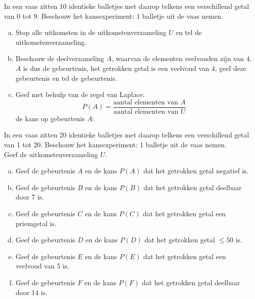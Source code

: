 \documentclass[12pt,a4paper,twoside]{article}
\begin{document}
\begin{oefening}
In een vaas zitten 10 identieke balletjes met daarop telkens een verschillend getal van 0 tot 9. Beschouw het kansexperiment: 1 balletje uit de vaas nemen.
\begin{enumerate}[(a)]
  \item Stop alle uitkomsten in de uitkomstenverzameling $U$ en tel de uitkomstenverzameling.
  \item Beschouw de deelverzameling $A$, waarvan de elementen veelvouden zijn van $4$. $A$ is dus de gebeurtenis, het getrokken getal is een veelvoud van $4$, geef deze gebeurtenis en tel de gebeurtenis.
  \item Geef met behulp van de regel van Laplace:
  $$P(A)=\dfrac{\mbox{aantal elementen van }A}{\mbox{aantal elementen van }U}$$
  de kans op gebeurtenis $A$:
\end{enumerate}
\end{oefening}
\vspace*{0.5cm}

\begin{oefening}
In een vaas zitten 20 identieke balletjes met daarop telkens een verschillend getal van 1 tot 20. Beschouw het kansexperiment: 1 balletje uit de vaas nemen.\\
Geef de uitkomstenverzameling $U$.
\begin{enumerate}[(a)]
  \item Geef de gebeurtenis $A$ en de kans $P(A)$ dat het getrokken getal negatief is.
  \item Geef de gebeurtenis $B$ en de kans $P(B)$ dat het getrokken getal deelbaar door 7 is.
  \item Geef de gebeurtenis $C$ en de kans $P(C)$ dat het getrokken getal een priemgetal is.
  \item Geef de gebeurtenis $D$ en de kans $P(D)$ dat het getrokken getal $\leq 50$ is.
  \item Geef de gebeurtenis $E$ en de kans $P(E)$ dat het getrokken getal een veelvoud van 5 is.
  \item Geef de gebeurtenis $F$ en de kans $P(F)$ dat het getrokken getal deelbaar door 14 is.
\end{enumerate}
\end{oefening}
\end{document}

